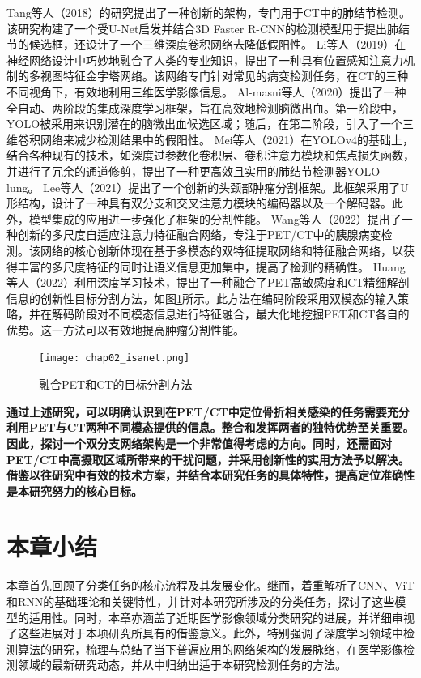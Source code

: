 Tang等人\cite{tang2018automated}（2018）的研究提出了一种创新的架构，专门用于CT中的肺结节检测。该研究构建了一个受U-Net启发并结合3D Faster R-CNN的检测模型用于提出肺结节的候选框，还设计了一个三维深度卷积网络去降低假阳性。
Li等人\cite{li2019mvp}（2019）在神经网络设计中巧妙地融合了人类的专业知识，提出了一种具有位置感知注意力机制的多视图特征金字塔网络。该网络专门针对常见的病变检测任务，在CT的三种不同视角下，有效地利用三维医学影像信息。
Al-masni等人\cite{al2020two}（2020）提出了一种全自动、两阶段的集成深度学习框架，旨在高效地检测脑微出血。第一阶段中，YOLO被采用来识别潜在的脑微出血候选区域；随后，在第二阶段，引入了一个三维卷积网络来减少检测结果中的假阳性。
Mei等人\cite{mei2021yolo}（2021）在YOLOv4的基础上，结合各种现有的技术，如深度过参数化卷积层、卷积注意力模块和焦点损失函数，并进行了冗余的通道修剪，提出了一种更高效且实用的肺结节检测器YOLO-lung。
Lee等人\cite{lee2021dual}（2021）提出了一个创新的头颈部肿瘤分割框架。此框架采用了U形结构，设计了一种具有双分支和交叉注意力模块的编码器以及一个解码器。此外，模型集成的应用进一步强化了框架的分割性能。
Wang等人\cite{wang2022maff}（2022）提出了一种创新的多尺度自适应注意力特征融合网络，专注于PET/CT中的胰腺病变检测。该网络的核心创新体现在基于多模态的双特征提取网络和特征融合网络，以获得丰富的多尺度特征的同时让语义信息更加集中，提高了检测的精确性。
Huang等人\cite{huang2022isa}（2022）利用深度学习技术，提出了一种融合了PET高敏感度和CT精细解剖信息的创新性目标分割方法，如图\ref{fig:chap02_isanet}所示。此方法在编码阶段采用双模态的输入策略，并在解码阶段对不同模态信息进行特征融合，最大化地挖掘PET和CT各自的优势。这一方法可以有效地提高肿瘤分割性能。

\begin{figure}[htbp]
    \centering
    \texttt{[image: chap02\_isanet.png]}
    \caption{融合PET和CT的目标分割方法}
    \label{fig:chap02_isanet}
\end{figure}

\textbf{通过上述研究，可以明确认识到在PET/CT中定位骨折相关感染的任务需要充分利用PET与CT两种不同模态提供的信息。整合和发挥两者的独特优势至关重要。因此，探讨一个双分支网络架构是一个非常值得考虑的方向。同时，还需面对PET/CT中高摄取区域所带来的干扰问题，并采用创新性的实用方法予以解决。借鉴以往研究中有效的技术方案，并结合本研究任务的具体特性，提高定位准确性是本研究努力的核心目标。}

\section{本章小结}

本章首先回顾了分类任务的核心流程及其发展变化。继而，着重解析了CNN、ViT和RNN的基础理论和关键特性，并针对本研究所涉及的分类任务，探讨了这些模型的适用性。同时，本章亦涵盖了近期医学影像领域分类研究的进展，并详细审视了这些进展对于本项研究所具有的借鉴意义。此外，特别强调了深度学习领域中检测算法的研究，梳理与总结了当下普遍应用的网络架构的发展脉络，在医学影像检测领域的最新研究动态，并从中归纳出适于本研究检测任务的方法。